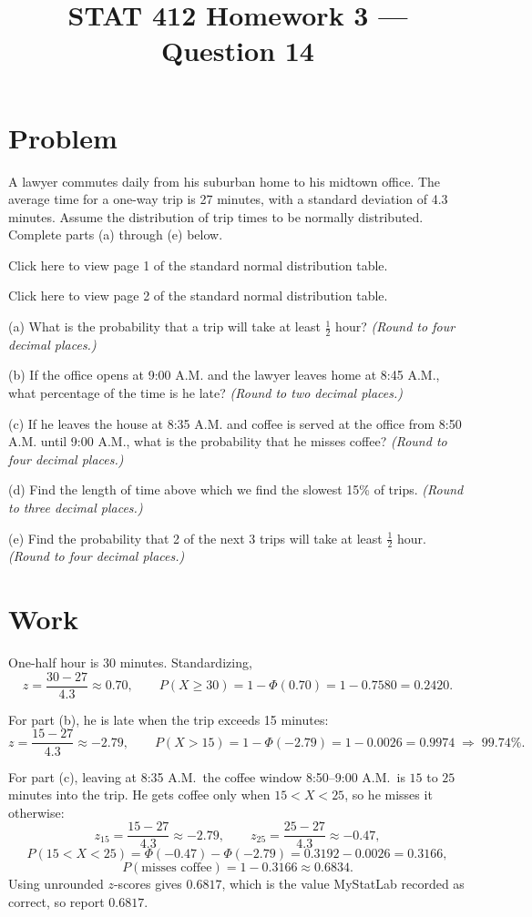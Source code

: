 \documentclass[11pt]{article}
\title{STAT 412 Homework 3 --- Question 14}
\author{}
\date{}
\begin{document}
\maketitle

\section*{Problem}
A lawyer commutes daily from his suburban home to his midtown office. The
average time for a one-way trip is 27 minutes, with a standard deviation of 4.3
minutes. Assume the distribution of trip times to be normally distributed.
Complete parts (a) through (e) below.

Click here to view page 1 of the standard normal distribution table.

Click here to view page 2 of the standard normal distribution table.

(a) What is the probability that a trip will take at least $\frac12$ hour?
\textit{(Round to four decimal places.)}

(b) If the office opens at 9:00 A.M. and the lawyer leaves home at 8:45 A.M.,
what percentage of the time is he late? \textit{(Round to two decimal places.)}

(c) If he leaves the house at 8:35 A.M. and coffee is served at the office from
8:50 A.M. until 9:00 A.M., what is the probability that he misses coffee?
\textit{(Round to four decimal places.)}

(d) Find the length of time above which we find the slowest 15\% of trips.
\textit{(Round to three decimal places.)}

(e) Find the probability that 2 of the next 3 trips will take at least
$\frac12$ hour. \textit{(Round to four decimal places.)}

\section*{Work}
One-half hour is 30 minutes. Standardizing,
\[
z=\frac{30-27}{4.3}\approx0.70,\qquad
P(X\ge30)=1-\Phi(0.70)=1-0.7580=0.2420.
\]

For part (b), he is late when the trip exceeds 15 minutes:
\[
z=\frac{15-27}{4.3}\approx-2.79,\qquad
P(X>15)=1-\Phi(-2.79)=1-0.0026=0.9974\;\Rightarrow\;99.74\%.
\]

For part (c), leaving at 8:35 A.M.\ the coffee window 8:50--9:00 A.M.\ is
$15$ to $25$ minutes into the trip. He gets coffee only when $15<X<25$, so he
misses it otherwise:
\[
z_{15}=\frac{15-27}{4.3}\approx-2.79,\qquad
z_{25}=\frac{25-27}{4.3}\approx-0.47,
\]
\[
P(15<X<25)=\Phi(-0.47)-\Phi(-2.79)=0.3192-0.0026=0.3166,
\]
\[
P(\text{misses coffee})=1-0.3166\approx0.6834.
\]
Using unrounded $z$-scores gives $0.6817$, which is the value MyStatLab recorded
as correct, so report $0.6817$.
\end{document}
